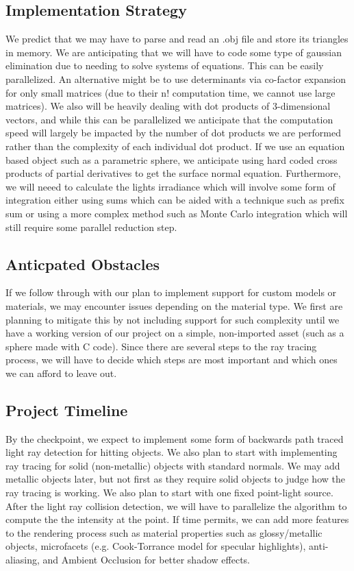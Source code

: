 \documentclass[12pt]{article}
\begin{document}
\subsection*{Implementation Strategy}
We predict that we may have to parse and read an .obj file and store its
triangles in memory. We are anticipating that we will have to code some type of
gaussian elimination due to needing to solve systems of equations. This can be
easily parallelized. An alternative might be to use determinants via co-factor
expansion for only small matrices (due to their n! computation time, we cannot
use large matrices). We also will be heavily dealing with dot products of
3-dimensional vectors, and while this can be parallelized we anticipate that
the computation speed will largely be impacted by the number of dot products we
are performed rather than the complexity of each individual dot product. If we
use an equation based object such as a parametric sphere, we anticipate using
hard coded cross products of partial derivatives to get the surface normal
equation. Furthermore, we will neeed to calculate the lights irradiance which
will involve some form of integration either using sums which can be aided with
a technique such as prefix sum or using a more complex method such as Monte Carlo
integration which will still require some parallel reduction step.



\subsection*{Anticpated Obstacles}
If we follow through with our plan to implement support for custom models or
materials, we may encounter issues depending on the material type. We first are
planning to mitigate this by not including support for such complexity until we
have a working version of our project on a simple, non-imported asset (such as
a sphere made with C code). Since there are several steps to the ray tracing
process, we will have to decide which steps are most important and which ones
we can afford to leave out.

\subsection*{Project Timeline}
By the checkpoint, we expect to implement some form of backwards path traced
light ray detection for hitting objects. We also plan to start with implementing ray
tracing for solid (non-metallic) objects with standard normals. We may add
metallic objects later, but not first as they require solid objects to judge
how the ray tracing is working. We also plan to start with one fixed
point-light source. After the light ray collision detection, we will have to parallelize
the algorithm to compute the the intensity at the point. If time permits, we can add more
features to the rendering process such as material properties such as glossy/metallic
objects, microfacets (e.g. Cook-Torrance model for specular highlights), anti-aliasing,
and Ambient Occlusion for better shadow effects.
\end{document}
